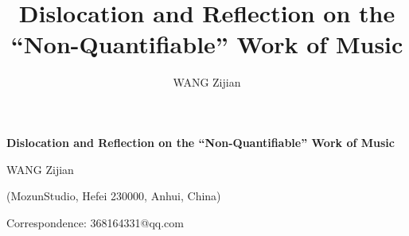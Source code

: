 \documentclass[11pt,a4paper]{article}
\title{Dislocation and Reflection on the ``Non-Quantifiable'' Work of Music}
\author{WANG Zijian}
\date{}
\begin{document}

\begin{center}
  {\sffamily\bfseries\fontsize{17}{21}\selectfont
   Dislocation and Reflection on the ``Non-Quantifiable'' Work of Music\par}
  \vspace{0.9em}
  {\normalsize WANG Zijian\par}
  \vspace{0.35em}
  {\small (MozunStudio, Hefei 230000, Anhui, China)\par}
  \vspace{0.25em}
  {\small Correspondence: 368164331@qq.com\par}
\end{center}
\vspace{0.4em}
\end{document}
